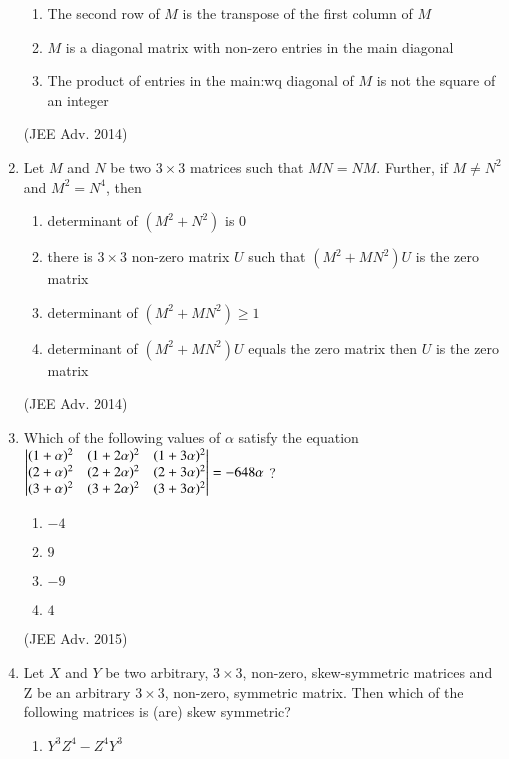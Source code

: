 \documentclass[journal,12pt,twocolumn]{IEEEtran}
\theoremstyle{remark}
\begin{document}
\begin{enumerate}[label=\arabic*)]
\begin{enumerate}[label=(\alph*)]
							\item The second row of $M$ is the transpose of the first column of $M$
							\item $M$ is a diagonal matrix with non-zero entries in the main diagonal
							\item The product of entries in the main:wq diagonal of $M$ is not the square of an integer
						\end{enumerate}
						\hfill (JEE Adv. 2014)\\
				\item
					Let $M$ and $N$ be two $3 \times 3$ matrices such that $MN=NM$. Further, if $M \neq N^2$ and $M^2 = N^4$, then
						\begin{enumerate}[label=(\alph*)]
							\item determinant of $(M^2 + N^2)$ is 0
							\item there is $3 \times 3$ non-zero matrix $U$ such that $(M^2+MN^2)U$ is the zero matrix
							\item determinant of $(M^2 + MN^2) \geq 1$
							\item determinant of $(M^2 + MN^2)U$ equals the zero matrix then $U$ is the zero matrix
						\end{enumerate}
						\hfill (JEE Adv. 2014)\\
				\item
					Which of the following values of $\alpha$ satisfy the equation
						$\begin{vmatrix}
							(1 + \alpha)^2 & (1 + 2\alpha)^2 & (1+3\alpha)^2\\
							(2 + \alpha)^2 & (2 + 2\alpha)^2 & (2+3\alpha)^2\\
							(3 + \alpha)^2 & (3 + 2\alpha)^2 & (3+3\alpha)^2
						\end{vmatrix} = -648 \alpha $ ?
							\begin{enumerate}[label=(\alph*)]
								\item $-4$
								\item $9$
								\item $-9$
								\item $4$
							\end{enumerate}
							\hfill (JEE Adv. 2015)\\
				\item
					Let $X$ and $Y$ be two arbitrary, $3 \times 3$, non-zero, skew-symmetric matrices and Z be an arbitrary $3 \times 3$, non-zero, symmetric matrix. Then which of the following matrices is (are) skew symmetric?
					\begin{enumerate}[label=(\alph*)]
						\item $Y^3Z^4 -Z^4Y^3$

\end{enumerate}
\end{enumerate}
\end{document}

